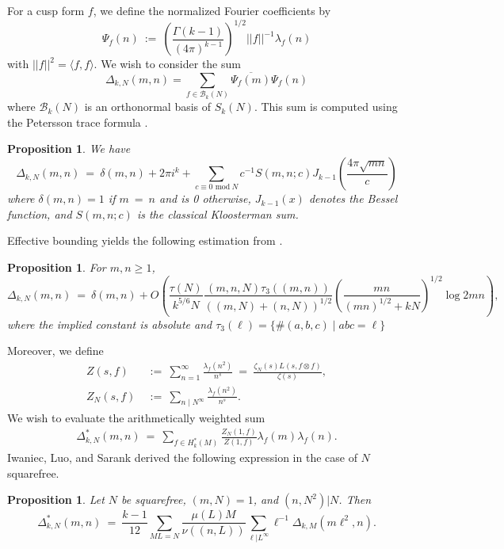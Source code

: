 \documentclass[11pt, reqno]{amsart}
\newtheorem{prop}[theorem]{Proposition}
\theoremstyle{definition}
\theoremstyle{remark}
\numberwithin{equation}{section}
\renewcommand{\bar}{\overline}
\begin{document}
For a cusp form $f$, we define the normalized Fourier coefficients by 
$$\Psi_f(n) \ := \ \left( \frac{\Gamma(k-1)}{(4\pi)^{k-1}}\right)^{1/2}||f||^{-1}\lambda_f(n)$$
with $||f||^2=\langle f,f\rangle.$ We wish to consider the sum
$$\Delta_{k,N}(m,n)=\sum_{f \in \mathcal{B}_k(N)}\bar{\Psi_f(m)}\Psi_f(n)$$
where $\mathcal{B}_k(N)$ is an orthonormal basis of $S_k(N).$ This sum is computed using the Petersson trace formula \cite{Petersson1932}\cite{iwaniec-kwalski2004analytic}. 
\begin{prop}\label{eq:peter} We have
    \begin{equation}
        \Delta_{k,N}(m,n)\ =\ \delta(m,n)+2\pi i^k+\sum_{c \equiv 0 \text{ mod}\: N}c^{-1}S(m,n;c)J_{k-1}\left( \frac{4\pi \sqrt{mn}}{c}\right)
         \end{equation}
    where $\delta(m,n)=1$ if $m \ = \ n$ and is 0 otherwise, $J_{k-1}\left( x\right)$ denotes the Bessel function, and
    $S(m,n;c)$ is the classical Kloosterman sum.
\end{prop}
Effective bounding yields the following estimation from \cite{ILS2}.
\begin{prop}\label{prop:peter aprox. ILS2.2}
For $m,n \geq 1$,
        \begin{equation}
        \Delta_{k,N}(m,n)\ =\ \delta(m,n)+O\left(\frac{\tau(N)}{k^{5/6}N}\frac{(m,n,N)\tau_3((m,n))}{((m,N)+(n,N))^{1/2}} \left(\frac{mn}{(mn)^{1/2}+kN} \right)^{1/2}\log 2mn\right),
        \end{equation}
    where the implied constant is absolute and $\tau_3(\ell)=\{\#(a,b,c)\; | \; abc=\ell \}$
\end{prop}
Moreover, we define
\begin{align}\label{def:Z_func}
Z(s, f)\ & := \ \sum_{n=1}^{\infty} \frac{\lambda_f\left(n^2\right)}{n^s}\ =\ \frac{\zeta_N(s) L(s, f \otimes f)}{\zeta(s)},
\\\label{def:Z_N_func}
Z_N(s,f)\ & :=\ \sum_{n\mid N^\infty} \frac{\lambda_f(n^2)}{n^s}.
\end{align}
We wish to evaluate the arithmetically weighted sum 
\begin{align}\label{def:Deltastar}
    \Delta^*_{k,N}(m,n)\ =\ \sum_{f \in H^*_k(M)}\frac{Z_N(1,f)}{Z(1,f)}\lambda_f(m)\lambda_f(n).
\end{align}
Iwaniec, Luo, and Sarank derived the following expression in the case of $N$ squarefree.
\begin{prop} \label{prop:ILS_Lem_2.7}
    Let $N$ be squarefree, $(m,N)=1$, and $(n,N^2)|N$. Then
    \begin{equation}\label{eq:harm avg}
        \Delta^*_{k,N}(m,n)\ =\ \frac{k-1}{12}\sum_{ML=N}\frac{\mu(L)M}{\nu((n,L))}\sum_{\ell |L^{\infty}}\ell^{-1}\Delta_{k,M}(m\ell^2,n).
    \end{equation}
\end{prop}
\end{document}

